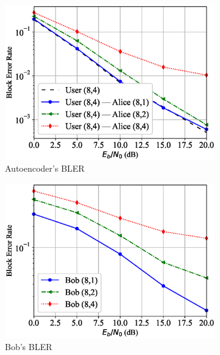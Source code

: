 \begin{figure}[tp!]
	\begin{subfigure}{0.3\textwidth}
		\includegraphics[width=\linewidth]{figs/covert_autoencoder_bler_rician}
		\caption{Autoencoder's BLER}
		\label{fig:rician_resutls_ae}
	\end{subfigure}
	\hspace*{\fill}
	\begin{subfigure}{0.3\textwidth}
		\includegraphics[width=\linewidth]{figs/bob_bler_rician}
		\caption{Bob's BLER}
		\label{fig:rician_resutls_bob}	
	\end{subfigure}
	\hspace*{\fill}
	\begin{subfigure}{0.3\textwidth}

\end{subfigure}
\end{figure}
